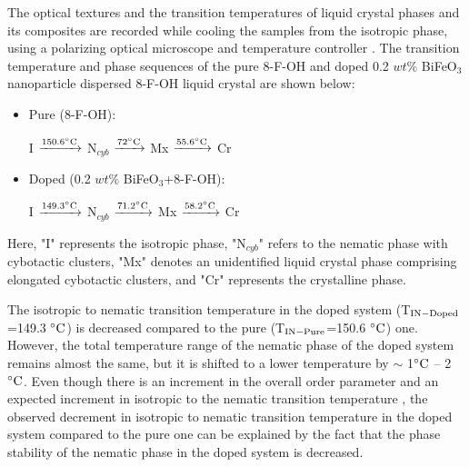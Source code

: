 \documentclass[reprint,amsfonts,amsmath,amssymb,aps,pre,floatfix,10pt]{revtex4-1}
\begin{document}
The optical textures and the transition temperatures of liquid crystal phases and its composites are recorded while cooling the samples from the isotropic phase, using a polarizing optical microscope and temperature controller \cite{kumar2018quantum_10, khan2017elastic_11, kumar2018nanodoping_12}. The transition temperature and phase sequences of the pure 8-F-OH \cite{kaur2023polar} and doped 0.2 $wt\%$ BiFeO$_3$ nanoparticle dispersed 8-F-OH liquid crystal are shown below:
\begin{itemize}
\item Pure (8-F-OH): 

I $\xrightarrow{150.6 ^{\circ}{\rm C}}$  N$_{cyb}$ $\xrightarrow{72^{\circ}{\rm C}}$   Mx $\xrightarrow{55.6 ^{\circ}{\rm C}}$  Cr

\item Doped (0.2 $wt\%$ BiFeO$_3$+8-F-OH): 

I $\xrightarrow{149.3 ^{\circ}{\rm C}}$  N$_{cyb}$ $\xrightarrow{71.2 ^{\circ}{\rm C}}$  Mx $\xrightarrow{58.2 ^{\circ}{\rm C}}$ Cr
\end{itemize}
Here, "I" represents the isotropic phase, "N$_{cyb}$" refers to the nematic phase with cybotactic clusters, "Mx" denotes an unidentified liquid crystal phase comprising elongated cybotactic clusters, and "Cr" represents the crystalline phase.

The isotropic to nematic transition temperature in the doped system (T$_{\rm IN-Doped}$=149.3 $^{\circ}{\rm C}$) is decreased compared to the pure (T$_{\rm IN-Pure}$=150.6 $^{\circ}{\rm C}$) one. However, the total temperature range of the nematic phase of the doped system remains almost the same, but it is shifted to a lower temperature by $\sim$ 1$^{\circ}{\rm C}$ – 2$^{\circ}{\rm C}$. Even though there is an increment in the overall order parameter and an expected increment in isotropic to the nematic transition temperature \cite{lopatina2009theory_13}, the observed decrement in isotropic to nematic transition temperature in the doped system compared to the pure one can be explained by the fact that the phase stability of the nematic phase in the doped system is decreased.
\end{document}
